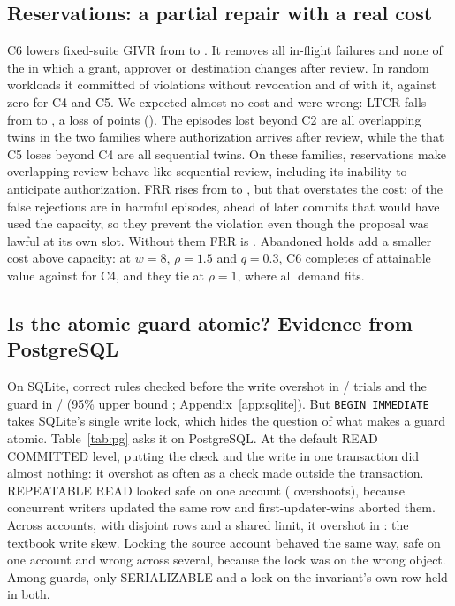 \documentclass[10pt]{article}
\begin{document}
\subsection{Reservations: a partial repair with a real cost}
C6 lowers fixed-suite GIVR from \givrCtwo{} to \givrCsix{}. It removes all \ladderInFlight{} in-flight failures and none of the \ladderPostReview{} in which a grant, approver or destination changes after review. In random workloads it committed \wlCsixNoRevokeK{} of \wlCsixNoRevokeN{} violations without revocation and \wlCsixRevokeK{} of \wlCsixRevokeN{} with it, against zero for C4 and C5. We expected almost no cost and were wrong: LTCR falls from \ltcrCtwo{} to \ltcrCsix{}, a loss of \ltcrDCtwoCsix{} points (\ltcrDCtwoCsixCI{}). The \csixLostLawful{} episodes lost beyond C2 are all overlapping twins in the two families where authorization arrives after review, while the \guardLostAuthTotal{} that C5 loses beyond C4 are all sequential twins. On these families, reservations make overlapping review behave like sequential review, including its inability to anticipate authorization. FRR rises from \frrCtwo{} to \frrCsix{}, but that overstates the cost: \csixFrGuarding{} of the \csixFrAll{} false rejections are in harmful episodes, ahead of later commits that would have used the capacity, so they prevent the violation even though the proposal was lawful at its own slot. Without them FRR is \csixFrrRest{}. Abandoned holds add a smaller cost above capacity: at $w=8$, $\rho=1.5$ and $q=0.3$, C6 completes \wlGoodCsixQHighRhoHigh{} of attainable value against \wlGoodCfourQHighRhoHigh{} for C4, and they tie at $\rho=1$, where all demand fits.

\subsection{Is the atomic guard atomic? Evidence from PostgreSQL}
On SQLite, correct rules checked before the write overshot in \raceSnapViol{}/\raceSnapN{} trials and the guard in \raceAtomViol{}/\raceAtomN{} (95\% upper bound \raceAtomUpper{}; Appendix~\ref{app:sqlite}). But \texttt{BEGIN IMMEDIATE} takes SQLite's single write lock, which hides the question of what makes a guard atomic. Table~\ref{tab:pg} asks it on PostgreSQL. At the default READ COMMITTED level, putting the check and the write in one transaction did almost nothing: it overshot as often as a check made outside the transaction. REPEATABLE READ looked safe on one account (\pgRRSame{} overshoots), because concurrent writers updated the same row and first-updater-wins aborted them. Across accounts, with disjoint rows and a shared limit, it overshot in \pgRRCross{}: the textbook write skew. Locking the source account behaved the same way, safe on one account and wrong across several, because the lock was on the wrong object. Among guards, only SERIALIZABLE and a lock on the invariant's own row held in both.
\end{document}
